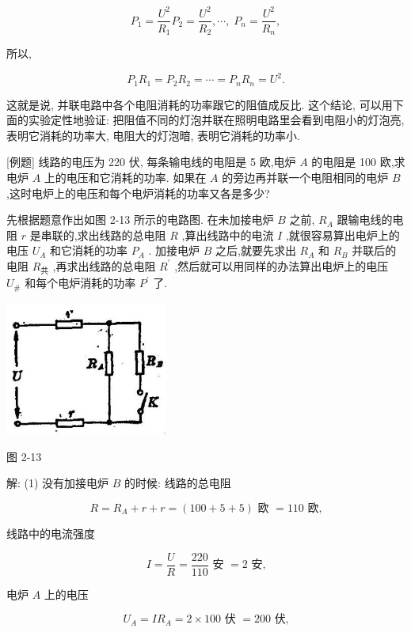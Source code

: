 \documentclass[10pt]{article}
\begin{document}
\[
{P}_{1} = \frac{{U}^{2}}{{R}_{1}}{P}_{2} = \frac{{U}^{2}}{{R}_{2}},\cdots ,\;{P}_{n} = \frac{{U}^{2}}{{R}_{n}},
\]

所以,

\[
{P}_{1}{R}_{1} = {P}_{2}{R}_{2} = \cdots = {P}_{n}{R}_{n} = {U}^{2}.
\]

这就是说, 并联电路中各个电阻消耗的功率跟它的阻值成反比. 这个结论, 可以用下面的实验定性地验证: 把阻值不同的灯泡并联在照明电路里会看到电阻小的灯泡亮, 表明它消耗的功率大, 电阻大的灯泡暗, 表明它消耗的功率小.

[例题] 线路的电压为 220 伏, 每条输电线的电阻是 5 欧,电炉 \(A\) 的电阻是 100 欧,求电炉 \(A\) 上的电压和它消耗的功率. 如果在 \(A\) 的旁边再并联一个电阻相同的电炉 \(B\) ,这时电炉上的电压和每个电炉消耗的功率又各是多少?

先根据题意作出如图 2-13 所示的电路图. 在未加接电炉 \(B\) 之前, \({R}_{A}\) 跟输电线的电阻 \(r\) 是串联的,求出线路的总电阻 \(R\) ,算出线路中的电流 \(I\) ,就很容易算出电炉上的电压 \({U}_{A}\) 和它消耗的功率 \({P}_{A}\) . 加接电炉 \(B\) 之后,就要先求出 \({R}_{A}\) 和 \({R}_{B}\) 并联后的电阻 \({R}_{共}\) ,再求出线路的总电阻 \({R}^{\prime }\) ,然后就可以用同样的办法算出电炉上的电压 \({U}_{\#}\) 和每个电炉消耗的功率 \({P}^{\prime }\) 了.

\begin{center}
\includegraphics[max width=0.4\textwidth]{images/01913056-1f15-74d8-9184-9aab52c9d66b_79_478300.jpg}
\end{center}

图 2-13

解: (1) 没有加接电炉 \(B\) 的时候: 线路的总电阻

\[
R = {R}_{A} + r + r = \left( {{100} + 5 + 5}\right) \text{ 欧 } = {110}\text{ 欧,}
\]

线路中的电流强度

\[
I = \frac{U}{R} = \frac{220}{110}\text{ 安 } = 2\text{ 安,}
\]

电炉 \(A\) 上的电压

\[
{U}_{A} = I{R}_{A} = 2 \times {100}\text{ 伏 } = {200}\text{ 伏,}
\]
\end{document}
